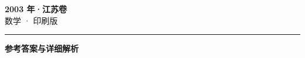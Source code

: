 \documentclass[zihao=5, a4paper]{ctexart}
\begin{document}
\begin{center}
  {\Large\bfseries 2003 年·江苏卷}\\[4pt]
  {\large 数学 · 印刷版}
\end{center}
\medskip
{}

\par\bigskip\hrule\bigskip
{}
\begin{center}{\large\bfseries 参考答案与详细解析}\end{center}
\smallskip

\end{document}

